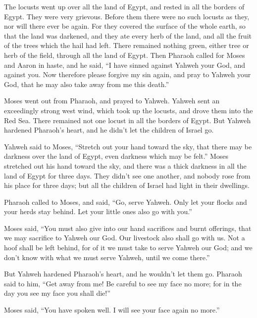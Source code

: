 {The locusts went up over all the land of Egypt, and rested in all the borders of Egypt. They were very grievous. Before them there were no such locusts as they, nor will there ever be again.
For they covered the surface of the whole earth, so that the land was darkened, and they ate every herb of the land, and all the fruit of the trees which the hail had left. There remained nothing green, either tree or herb of the field, through all the land of Egypt.
Then Pharaoh called for Moses and Aaron in haste, and he said, “I have sinned against Yahweh your God, and against you.
Now therefore please forgive my sin again, and pray to Yahweh your God, that he may also take away from me this death.”
\par }{\PP {}Moses went out from Pharaoh, and prayed to Yahweh.
Yahweh sent an exceedingly strong west wind, which took up the locusts, and drove them into the Red Sea. There remained not one locust in all the borders of Egypt.
But Yahweh hardened Pharaoh’s heart, and he didn’t let the children of Israel go.
\par }{\PP {}Yahweh said to Moses, “Stretch out your hand toward the sky, that there may be darkness over the land of Egypt, even darkness which may be felt.”
Moses stretched out his hand toward the sky, and there was a thick darkness in all the land of Egypt for three days.
They didn’t see one another, and nobody rose from his place for three days; but all the children of Israel had light in their dwellings.
\par }{\PP {}Pharaoh called to Moses, and said, “Go, serve Yahweh. Only let your flocks and your herds stay behind. Let your little ones also go with you.”
\par }{\PP {}Moses said, “You must also give into our hand sacrifices and burnt offerings, that we may sacrifice to Yahweh our God.
Our livestock also shall go with us. Not a hoof shall be left behind, for of it we must take to serve Yahweh our God; and we don’t know with what we must serve Yahweh, until we come there.”
\par }{\PP {}But Yahweh hardened Pharaoh’s heart, and he wouldn’t let them go.
Pharaoh said to him, “Get away from me! Be careful to see my face no more; for in the day you see my face you shall die!”
\par }{\PP {}Moses said, “You have spoken well. I will see your face again no more.”

}
